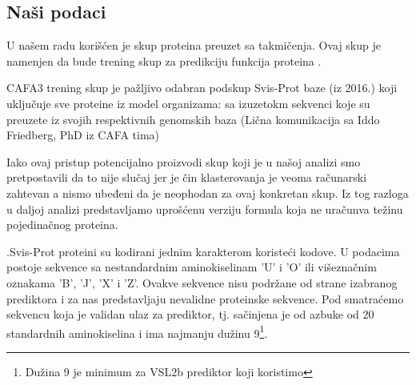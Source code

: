 %

\subsection{Naši podaci}

U našem radu korišćen je skup proteina preuzet sa  takmičenja.
Ovaj skup je namenjen da bude trening skup za predikciju funkcija proteina \parencite{CAFA}. 

CAFA3 trening skup je pažljivo odabran podskup Svis-Prot baze (iz 2016.) koji
uključuje sve proteine iz model organizama:  sa izuzetokm sekvenci  koje su preuzete iz svojih respektivnih genomskih baza (Lična
komunikacija sa Iddo Friedberg, PhD iz CAFA tima)

Iako ovaj pristup potencijalno proizvodi skup koji je  u našoj analizi smo pretpostavili da to nije slučaj jer je čin
klasterovanja je veoma računarski zahtevan a nismo ubeđeni da je neophodan za
ovaj konkretan skup. Iz tog razloga u daljoj analizi predstavljamo uprošćenu
verziju formula koja ne uračunva težinu pojedinačnog proteina.

.Svis-Prot proteini su kodirani jednim karakterom koristeći 
kodove.  U podacima postoje sekvence sa nestandardnim aminokiselinam 'U' i 'O'
ili višeznačnim oznakama 'B', 'J', 'X' i 'Z'.  Ovakve sekvence nisu podržane od
strane izabranog prediktora i za nas predstavljaju nevalidne proteinske sekvence. Pod
 smatraćemo sekvencu koja je validan
ulaz za prediktor, tj. sačinjena je od azbuke od 20 standardnih aminokiselina i
ima najmanju dužinu 9\footnote{ Dužina 9 je minimum za VSL2b prediktor koji
koristimo}.

